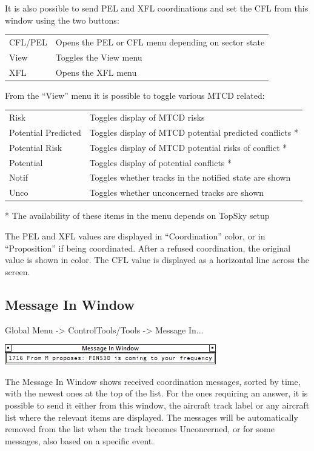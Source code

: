 \documentclass[11pt,a4paper]{memoir}
\newcommand{\colorref}[1]{\textit{\hyperref[#1]{\StrDel{#1}{color:}}}}
\begin{document}
It is also possible to send PEL and XFL coordinations and set the CFL from this window using the two buttons:

\begin{tabular}{l l}
    CFL/PEL     & Opens the PEL or CFL menu depending on sector state\\
    View        & Toggles the View menu\\
    XFL         & Opens the XFL menu\\
\end{tabular}

From the “View” menu it is possible to toggle various MTCD related:

\begin{tabular}{l l}
    Risk                    & Toggles display of MTCD risks\\
    Potential Predicted     & Toggles display of MTCD potential predicted conflicts *\\
    Potential Risk          & Toggles display of MTCD potential risks of conflict *\\
    Potential               & Toggles display of potential conflicts *\\
    Notif                   & Toggles whether tracks in the notified state are shown\\
    Unco                    & Toggles whether unconcerned tracks are shown\\
\end{tabular}

* The availability of these items in the menu depends on TopSky setup

The PEL and XFL values are displayed in “Coordination” color, or in “Proposition” if being coordinated. After a refused coordination, the original value is shown in \colorref{color:Warning} color. The CFL value is displayed as a horizontal line across the screen.

\subsection{Message In Window}
\label{win:miw}

Global Menu -> ControlTools/Tools -> Message In...

\includegraphics{img/miw.png}

The Message In Window shows received coordination messages, sorted by time, with the newest ones at the top of the list. For the ones requiring an answer, it is possible to send it either from this window, the aircraft track label or any aircraft list where the relevant items are displayed. The messages will be automatically removed from the list when the track becomes Unconcerned, or for some messages, also based on a specific event.
\end{document}
